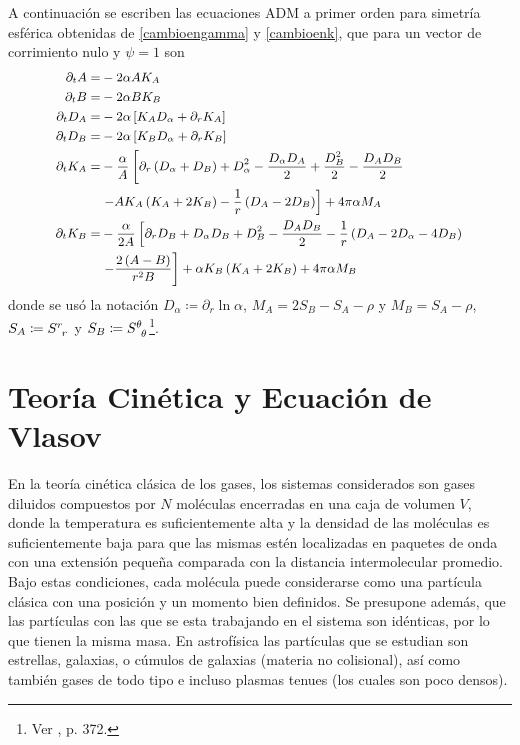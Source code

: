 \documentclass[11pt,twoside,openright,spanish]{report}
\numberwithin{equation}{chapter}
\numberwithin{figure}{chapter}
\numberwithin{table}{chapter}
\begin{document}
A continuación se escriben las ecuaciones ADM a primer orden para simetría esférica obtenidas de \eqref{cambioengamma} y \eqref{cambioenk}, que para un vector de corrimiento nulo y $\psi=1$ son
\begin{subequations}
	{\small
	\begin{align}
	\partial_tA=&-2\alpha AK_A\\
	\partial_tB=&-2\alpha BK_B\\
	\partial_tD_A=&-2\alpha\left[K_AD_\alpha+\partial_rK_A\right]\\
	\partial_tD_B=&-2\alpha\left[K_BD_\alpha+\partial_rK_B\right]\\
	\nonumber
	\partial_tK_A=&-\frac{\alpha}{A}\left[\partial_r\left(D_\alpha+D_B\right)+D_\alpha^2-\frac{D_\alpha D_A}{2}+\frac{D_B^2}{2}-\frac{D_AD_B}{2}\right.\\
	&\left.-AK_A\left(K_A+2K_B\right)-\frac{1}{r}\left(D_A-2D_B\right)\right]+4\pi\alpha M_A\\
	\nonumber
	\partial_tK_B=&-\frac{\alpha}{2A}\left[\partial_rD_B+D_\alpha D_B+D_B^2-\frac{D_AD_B}{2}-\frac{1}{r}\left(D_A-2D_\alpha-4D_B\right)\right.\\
	&\left.-\frac{2\left(A-B\right)}{r^2B}\right]+\alpha K_B\left(K_A+2K_B\right)+4\pi\alpha M_B\label{cambiokb}
	\end{align}\label{adm}}
\end{subequations}
donde se usó la notación $D_\alpha\coloneqq\partial_r\ln\alpha$, $M_A=2S_B-S_A-\rho$ y $M_B=S_A-\rho$, $S_A\coloneqq \tensor{S}{^r_r}$ y $S_B\coloneqq\tensor{S}{^\theta_\theta}$\footnote{Ver \citet{alcubierre}, p. 372.}.

\chapter{Teoría Cinética y Ecuación de Vlasov}\label{tcyedb}

\noindent
En la teoría cinética clásica de los gases, los sistemas considerados son gases diluidos compuestos por $N$ moléculas encerradas en una caja de volumen $V$, donde la temperatura es suficientemente alta y la densidad de las moléculas es suficientemente baja para que las mismas estén localizadas en paquetes de onda con una extensión pequeña comparada con la distancia intermolecular promedio. Bajo estas condiciones, cada molécula puede considerarse como una partícula clásica con una posición y un momento bien definidos. Se presupone además, que las partículas con las que se esta trabajando en el sistema son idénticas, por lo que tienen la misma masa. En astrofísica las partículas que se estudian son estrellas, galaxias, o cúmulos de galaxias (materia no colisional), así como también gases de todo tipo e incluso plasmas tenues (los cuales son poco densos).
\end{document}
